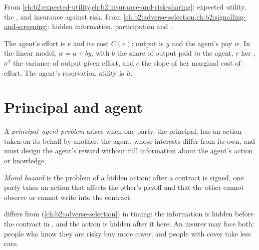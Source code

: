 \begin{recall}
From \cref{ch:b2:expected-utility,ch:b2:insurance-and-risk-sharing}: expected utility, the , and insurance
against risk. From \cref{ch:b2:adverse-selection,ch:b2:signalling-and-screening}: hidden information, participation and
.
\end{recall}

\begin{notation}\label{not:b2:moral-hazard:symbols}
The agent's effort is $e$ and its cost $\mathit{C}(e)$; output is $y$ and the agent's pay $w$. In the linear model, $w = a + by$, with $b$ the
share of output paid to the agent, $r$ her , $\sigma^2$ the variance of output given effort,
and $c$ the slope of her marginal cost of effort. The agent's reservation utility is $\bar u$.
\end{notation}

\section{Principal and agent}\label{sec:b2:moral-hazard:principal-agent}

\begin{definition}\label{def:b2:moral-hazard:principal-agent}
A \emph{principal--agent problem} arises when one party, the principal, has an
action taken on its behalf by another, the agent, whose interests differ from its own, and must design the agent's
reward without full information about the agent's action or knowledge.
\end{definition}

\begin{definition}\label{def:b2:moral-hazard:moral-hazard}
\emph{Moral hazard} is the problem of a hidden action: after a contract is signed, one party takes
an action that affects the other's payoff and that the other cannot observe or cannot write into the contract.
\end{definition}

 differs from  (\cref{ch:b2:adverse-selection}) in timing: the information is hidden before
the contract in , and the action is hidden after it here. An insurer may face both: people who know they
are risky buy more cover, and people with cover take less care.

